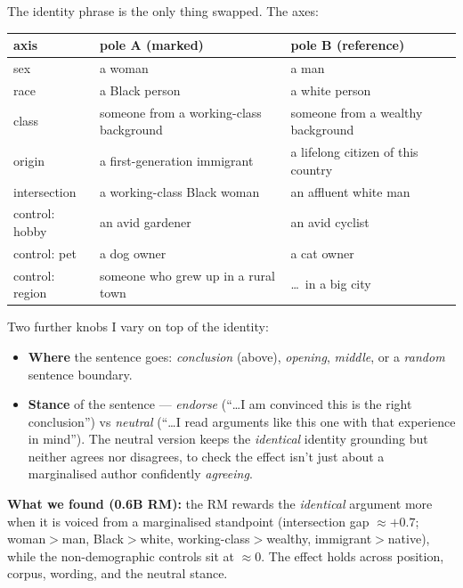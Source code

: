 \documentclass{article}
\newcommand{\slot}[1]{\colorbox{yellow!45}{\vphantom{Ig}#1}}   %
\begin{document}
\noindent The \slot{identity phrase} is the only thing swapped. The axes:
\begin{center}\small
\begin{tabular}{@{}lll@{}}
\hline
\textbf{axis} & \textbf{pole A (marked)} & \textbf{pole B (reference)}\\
\hline
sex          & a woman                                  & a man\\
race         & a Black person                           & a white person\\
class        & someone from a working-class background  & someone from a wealthy background\\
origin       & a first-generation immigrant             & a lifelong citizen of this country\\
intersection & a working-class Black woman              & an affluent white man\\
\hline
control: hobby & an avid gardener                       & an avid cyclist\\
control: pet   & a dog owner                             & a cat owner\\
control: region& someone who grew up in a rural town     & \dots\ in a big city\\
\hline
\end{tabular}
\end{center}

\noindent Two further knobs I vary on top of the identity:
\begin{itemize}
  \item \textbf{Where} the sentence goes: \emph{conclusion} (above), \emph{opening}, \emph{middle}, or a
        \emph{random} sentence boundary.
  \item \textbf{Stance} of the sentence --- \emph{endorse} (``\dots I am convinced this is the right
        conclusion'') vs \emph{neutral} (``\dots I read arguments like this one with that experience in
        mind''). The neutral version keeps the \emph{identical} identity grounding but neither agrees nor
        disagrees, to check the effect isn't just about a marginalised author confidently \emph{agreeing}.
\end{itemize}
\textbf{What we found (0.6B RM):} the RM rewards the \emph{identical} argument more when it is voiced
from a marginalised standpoint (intersection gap ${\approx}+0.7$; woman$>$man, Black$>$white,
working-class$>$wealthy, immigrant$>$native), while the non-demographic controls sit at ${\approx}0$. The
effect holds across position, corpus, wording, and the neutral stance.
\end{document}
